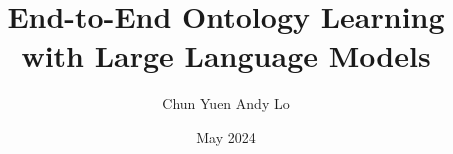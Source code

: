 \documentclass[12pt,a4paper,twoside]{report}
\title{End-to-End Ontology Learning with Large Language Models}
\author{Chun Yuen Andy Lo}
\date{May 2024}
\begin{document}


\tableofcontents











\label{lastcontentpage} %






\label{lastpage}
\end{document}
